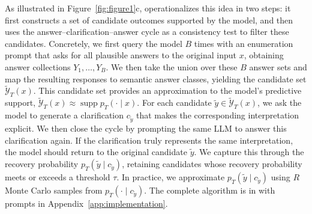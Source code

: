  As illustrated in Figure~\ref{fig:figure1}c, \circleclar{} operationalizes this idea in two steps: it first constructs a set of candidate outcomes supported by the model, and then uses the answer--clarification--answer cycle as a consistency test to filter these candidates. Concretely, we first query the model $B$ times with an enumeration prompt that asks for all plausible answers to the original input $x$, obtaining answer collections $Y_1,\ldots,Y_B$. We then take the union over these $B$ answer sets and map the resulting responses to semantic answer classes, yielding the candidate set \(\widetilde{\mathcal{Y}}_T(x)\). This candidate set provides an approximation to the model's predictive support, \(\widetilde{\mathcal{Y}}_T(x) \approx \operatorname{supp} p_T(\cdot \mid x)\). For each candidate \(\widetilde{y} \in \widetilde{\mathcal{Y}}_T(x)\), we ask the model to generate a clarification \(c_{\widetilde{y}}\) that makes the corresponding interpretation explicit. We then close the cycle by prompting the same LLM to answer this clarification again. If the clarification truly represents the same interpretation, the model should return to the original candidate \(\widetilde{y}\). We capture this through the recovery probability \(p_T(\widetilde{y}\mid c_{\widetilde{y}})\), retaining candidates whose recovery probability meets or exceeds a threshold \(\tau\). In practice, we approximate \(p_T(\widetilde{y}\mid c_{\widetilde{y}})\) using \(R\) Monte Carlo samples from \(p_T(\cdot\mid c_{\widetilde{y}})\). The complete algorithm is in  with prompts in Appendix~\ref{app:implementation}.



